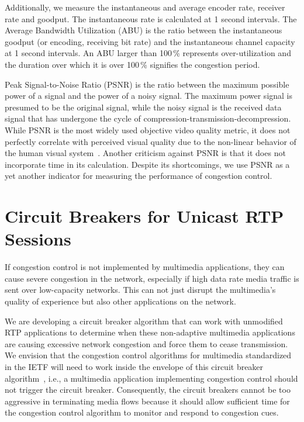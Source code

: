 Additionally, we measure the instantaneous and average encoder rate, receiver
rate and goodput. The instantaneous rate is calculated at 1 second intervals. The
Average Bandwidth Utilization (ABU) is the ratio between the instantaneous
goodput (or encoding, receiving bit rate) and the instantaneous channel
capacity at 1 second intervals. An ABU larger than 100\,\% represents over-utilization 
and the duration over which it is over 100\,\% signifies the congestion period.


Peak Signal-to-Noise Ratio (PSNR) is the ratio between the maximum possible
power of a signal and the power of a noisy signal. The maximum power signal is
presumed to be the original signal, while the noisy signal is the received data
signal that has undergone the cycle of compression-transmission-decompression.
While PSNR is the most widely used objective video quality metric, it does not
perfectly correlate with perceived visual quality due to the non-linear
behavior of the human visual system~\cite{itu-t-j247}. Another criticism
against PSNR is that it does not incorporate time in its calculation. Despite
its shortcomings, we use PSNR as a yet another indicator for measuring the
performance of congestion control.



\section{Circuit Breakers for Unicast RTP Sessions}

If congestion control is not implemented by multimedia applications, they can
cause severe congestion in the network, especially if high data rate media
traffic is sent over low-capacity networks. This can not just disrupt the
multimedia's quality of experience but also other applications on the network.

We are developing a circuit breaker algorithm that can work with unmodified
RTP applications to determine when these non-adaptive multimedia
applications are causing excessive network congestion and force them to cease
transmission.  We envision that the congestion control algorithms for
multimedia standardized in the IETF will need to work inside the envelope of
this circuit breaker algorithm~\cite{draft.rmcat.evaluate}, i.e., a multimedia
application implementing congestion control should not trigger the circuit
breaker. Consequently, the circuit breakers cannot be too aggressive in
terminating media flows because it should allow sufficient time for the
congestion control algorithm to monitor and respond to congestion cues.

